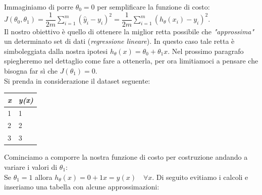 \begin{esempio}
  Immaginiamo di porre $\theta_0 = 0$ per semplificare la funzione di costo: $J(\theta_0, \theta_1) = \dfrac {1}{2m} \displaystyle \sum _{i=1}^m \left ( \hat{y}_{i}- y_{i} \right)^2 = \dfrac {1}{2m} \displaystyle \sum _{i=1}^m \left (h_\theta (x_{i}) - y_{i} \right)^2$. \\ Il nostro obiettivo è quello di ottenere la miglior retta possibile che \textit{"approssima"} un determinato set di dati (\textit{regressione lineare}). In questo caso tale retta è simboleggiata dalla nostra ipotesi $h_\theta(x) = \theta_0 + \theta_1 x$. Nel prossimo paragrafo spiegheremo nel dettaglio come fare a ottenerla, per ora limitiamoci a pensare che bisogna far sì che $J(\theta_1) = 0$.\\
  Si prenda in considerazione il dataset seguente:
\begin{table}[h!]
\centering
\begin{tabular}{|l|l|}
\hline
{\color[HTML]{FE0000} \textit{x}} & {\color[HTML]{FE0000} \textit{y(x)}} \\ \hline
1                                 & 1                                    \\ \hline
2                                 & 2                                    \\ \hline
3                                 & 3                                    \\ \hline
\end{tabular}
\end{table}
  Cominciamo a comporre la nostra funzione di costo per costruzione andando a variare i valori di $\theta_1$:\\
  Se $\theta_1 = 1$ allora  $h_\theta(x) = 0 + 1x = y(x) \,\,\,\,\,\,\forall x$. Di seguito evitiamo i calcoli e inseriamo una tabella con alcune approssimazioni:
  

\end{esempio}
